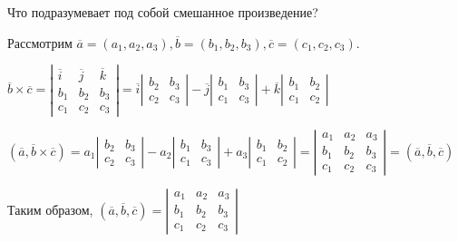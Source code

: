 	\begin{Example}
		Что подразумевает под собой смешанное произведение?
		
		Рассмотрим $\overline{a} = (a_1, a_2, a_3), \overline{b} = (b_1, b_2, b_3), \overline{c} = (c_1, c_2, c_3) $.
		
		$\overline{b} \times \overline{c} = 
		\left|\begin{array}{cccc}
			\overline{i}  & \overline{j}  & \overline{k}  \\ 
			b_1 &  b_2 & b_3 \\ 
			c_1 & c_2 & c_3
			\end{array}\right| = \overline{i} 
		\left|\begin{array}{cccc}
			b_2 & b_3 \\ 
			c_2 & c_3
			\end{array}\right| - \overline{j}
		\left|\begin{array}{cccc}
			b_1 & b_3 \\ 
			c_1 & c_3
			\end{array}\right| + \overline{k}
		\left|\begin{array}{cccc}
			b_1 & b_2 \\ 
			c_1 & c_2
			\end{array}\right| $
		
			$(\overline{a}, \overline{b} \times \overline{c}) = a_1
		\left|\begin{array}{cccc}
		b_2 & b_3 \\ 
		c_2 & c_3
		\end{array}\right| - 
		a_2 \left|\begin{array}{cccc}
			b_1 & b_3 \\ 
			c_1 & c_3
			\end{array}\right| + 
		a_3  \left|\begin{array}{cccc}
			b_1 & b_2 \\ 
			c_1 & c_2
			\end{array}\right| = 
		\left|\begin{array}{cccc}
			a_1  & a_2  & a_3  \\ 
			b_1 &  b_2 & b_3 \\ 
			c_1 & c_2 & c_3
			\end{array}\right| = (\overline{a}, \overline{b}, \overline{c})$

		Таким образом, $(\overline{a}, \overline{b}, \overline{c}) = \left|\begin{array}{cccc}
			a_1  & a_2  & a_3  \\ 
			b_1 &  b_2 & b_3 \\ 
			c_1 & c_2 & c_3
			\end{array}\right|$
	\end{Example}

